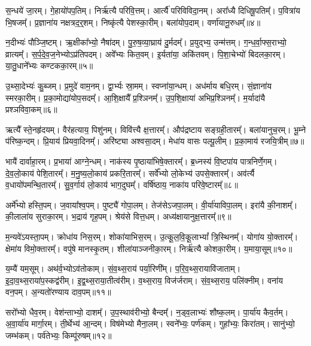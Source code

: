 स॒न्धये॑ जा॒रम्।
गे॒हायो॑पप॒तिम्।
निर्\mbox{}ऋ॑त्यै परिवि॒त्तम्।
आर्त्यै॑ परिविविदा॒नम्।
अरा᳚ध्यै दिधिषू॒पतिम्᳚।
प॒वित्रा॑य भि॒षजम्᳚।
प्र॒ज्ञाना॑य नक्षत्रद॒र्॒शम्।
निष्कृ॑त्यै पेशस्का॒रीम्।
बला॑योप॒दाम्।
वर्णा॑यानू॒रुधम्᳚॥४॥

न॒दीभ्यः॑ पौञ्जि॒ष्टम्।
ऋ॒क्षीका᳚भ्यो॒ नैषा॑दम्।
पु॒रु॒ष॒व्या॒घ्राय॑ दु॒र्मदम्᳚।
प्र॒युद्भ्य॒ उन्म॑त्तम्।
ग॒न्ध॒र्वा॒फ्स॒राभ्यो॒ व्रात्यम्᳚।
स॒र्प॒दे॒व॒\-ज॒नेभ्यो\-ऽप्र॑तिपदम्।
अवे᳚भ्यः कित॒वम्।
इ॒र्यता॑या॒ अकि॑तवम्।
पि॒शा॒चेभ्यो॑ बिदलका॒रम्।
या॒तु॒धाने᳚भ्यः कण्टकका॒रम्॥५॥

उ॒थ्सा॒देभ्यः॑ कु॒ब्जम्।
प्र॒मुदे॑ वाम॒नम्।
द्वा॒र्भ्यः स्रा॒मम्।
स्वप्ना॑या॒न्धम्।
अध॑र्माय बधि॒रम्।
सं॒ज्ञाना॑य स्मरका॒रीम्।
प्र॒का॒मोद्या॑योप॒सदम्᳚।
आ॒शि॒क्षायै᳚ प्र॒श्ञिनम्᳚।
उ॒प॒शि॒क्षाया॑ अभिप्र॒श्ञिनम्᳚।
म॒र्यादा॑यै प्रश्ञविवा॒कम्॥६॥

ऋत्यै᳚ स्ते॒नहृ॑दयम्।
वैर॑हत्याय॒ पिशु॑नम्।
विवि॑त्त्यै क्ष॒त्तारम्᳚।
औप॑द्रष्टाय सङ्ग्रही॒तारम्᳚।
बला॑यानुच॒रम्।
भू॒म्ने प॑रिष्क॒न्दम्।
प्रि॒याय॑ प्रियवा॒दिनम्᳚।
अरि॑ष्ट्या अश्वसा॒दम्।
मेधा॑य वासः पल्पू॒लीम्।
प्र॒का॒माय॑ रजयि॒त्रीम्॥७॥

भायै॑ दार्वाहा॒रम्।
प्र॒भाया॑ आग्ने॒न्धम्।
नाक॑स्य पृ॒ष्ठाया॑भि\-षे॒क्तारम्᳚।
ब्र॒ध्नस्य॑ वि॒ष्टपा॑य पात्रनिर्णे॒गम्।
दे॒व॒लो॒काय॑ पेशि॒तारम्᳚।
म॒नु॒ष्य॒लो॒काय॑ प्रकरि॒तारम्᳚।
सर्वे᳚भ्यो लो॒केभ्य॑ उपसे॒क्तारम्᳚।
अव॑र्त्यै व॒धायो॑पमन्थि॒तारम्᳚।
सु॒व॒र्गाय॑ लो॒काय॑ भाग॒दुघम्᳚।
वर्\mbox{}षि॑ष्ठाय॒ नाका॑य परिवे॒ष्टारम्᳚॥८॥

अर्मे᳚भ्यो हस्ति॒पम्।
ज॒वाया᳚श्व॒पम्।
पुष्ट्यै॑ गोपा॒लम्।
तेज॑से\-ऽजपा॒लम्।
वी॒र्या॑याविपा॒लम्।
इरा॑यै की॒नाशम्᳚।
की॒लाला॑य सुराका॒रम्।
भ॒द्राय॑ गृह॒पम्।
श्रेय॑से वित्त॒धम्।
अध्य॑क्षायानुक्ष॒त्तारम्᳚॥९॥

म॒न्यवे॑\-ऽयस्ता॒पम्।
क्रोधा॑य निस॒रम्।
शोका॑याभिस॒रम्।
उ॒त्कू॒ल॒वि॒कू॒लाभ्यां᳚ त्रि॒स्थिनम्᳚।
योगा॑य यो॒क्तारम्᳚।
क्षेमा॑य विमो॒क्तारम्᳚।
वपु॑षे मानस्कृ॒तम्।
शीला॑याञ्जनीका॒रम्।
निर्\mbox{}ऋ॑त्यै कोशका॒रीम्।
य॒माया॒सूम्॥१०॥

य॒म्यै॑ यम॒सूम्।
अथ॑र्व॒भ्यो\-ऽव॑तोकाम्।
सं॒व॒थ्स॒राय॑ पर्या॒रिणी᳚म्।
प॒रि॒व॒थ्स॒राया\-वि॑जाताम्।
इ॒दा॒व॒थ्स॒राया॑प॒\-स्कद्व॑रीम्।
इ॒द्व॒थ्स॒राया॒तीत्व॑रीम्।
व॒थ्स॒राय॒ विज॑र्जराम्।
सं॒व॒थ्स॒राय॒ पलि॑क्नीम्।
वना॑य वन॒पम्।
अ॒न्यतो॑रण्याय दाव॒पम्॥११॥

सरो᳚भ्यो धैव॒रम्।
वेश॑न्ताभ्यो॒ दाशम्᳚।
उ॒प॒स्थाव॑रीभ्यो॒ बैन्दम्᳚।
न॒ड्व॒लाभ्यः॑ शौष्क॒लम्।
पा॒र्या॑य कैव॒र्तम्।
अ॒वा॒र्या॑य मार्गा॒रम्।
ती॒र्थेभ्य॑ आ॒न्दम्।
विष॑मेभ्यो मैना॒लम्।
स्वने᳚भ्यः॒ पर्ण॑कम्।
गुहा᳚भ्यः॒ किरा॑तम्।
सानु॑भ्यो॒ जम्भ॑कम्।
पर्व॑तेभ्यः॒ किम्पू॑रुषम्॥१२॥

